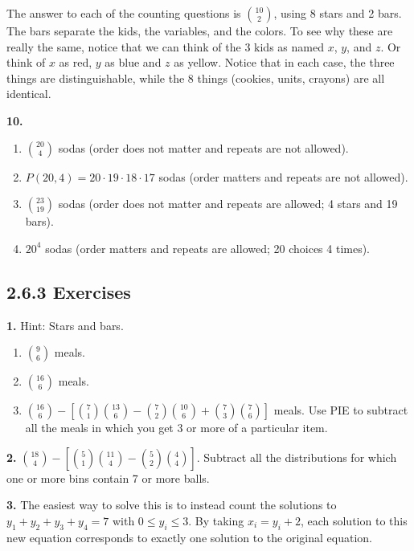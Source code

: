 \documentclass[10pt,]{book}
\theoremstyle{plain}
\theoremstyle{definition}
\theoremstyle{definition}
\theoremstyle{definition}
\numberwithin{equation}{section}
\begin{document}
The answer to each of the counting questions is \({10 \choose 2}\), using 8 stars and 2 bars. The bars separate the kids, the variables, and the colors. To see why these are really the same, notice that we can think of the 3 kids as named \(x\), \(y\), and \(z\). Or think of \(x\) as red, \(y\) as blue and \(z\) as yellow. Notice that in each case, the three things are distinguishable, while the 8 things (cookies, units, crayons) are all identical.
%
\par\smallskip
\noindent\textbf{10.}\quad{}\leavevmode%
\begin{enumerate}[label=(\alph*)]
\item\hypertarget{li-605}{}\({20 \choose 4}\) sodas (order does not matter and repeats are not allowed).%
\item\hypertarget{li-606}{}\(P(20, 4) = 20\cdot 19\cdot 18 \cdot 17\) sodas (order matters and repeats are not allowed).%
\item\hypertarget{li-607}{}\({23 \choose 19}\) sodas (order does not matter and repeats are allowed; 4 stars and 19 bars).%
\item\hypertarget{li-608}{}\(20^4\) sodas (order matters and repeats are allowed; 20 choices 4 times).%
\end{enumerate}
\par\smallskip
\subsection*{2.6.3 Exercises}
\noindent\textbf{1.}\quad{}
            Hint: Stars and bars.
\leavevmode%
\begin{enumerate}[label=(\alph*)]
\item\hypertarget{li-642}{}\({9 \choose 6}\) meals.%
\item\hypertarget{li-643}{}\({16 \choose 6}\) meals.%
\item\hypertarget{li-644}{}\({16 \choose 6} - \left[{7 \choose 1}{13 \choose 6} - {7 \choose 2}{10 \choose 6} + {7 \choose 3}{7 \choose 6}\right]\) meals.  Use PIE to subtract all the meals in which you get 3 or more of a particular item.%
\end{enumerate}
\par\smallskip
\noindent\textbf{2.}\quad{}
            \({18 \choose 4} - \left[ {5 \choose 1}{11 \choose 4} - {5 \choose 2}{4 \choose 4}\right]\). Subtract all the distributions for which one or more bins contain 7 or more balls.
\par\smallskip
\noindent\textbf{3.}\quad{}
            The easiest way to solve this is to instead count the solutions to \(y_1 + y_2 + y_3 + y_4 = 7\) with \(0 \le y_i \le 3\). By taking \(x_i = y_i+2\), each solution to this new equation corresponds to exactly one solution to the original equation.
\par
\end{document}
